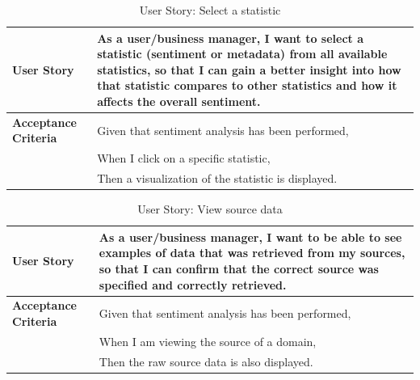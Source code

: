 \documentclass[12pt]{article}
\begin{document}
\begin{table}[htbp]
  \caption{User Story: Select a statistic}
  \begin{tabular}{|p{}|p{}|}
    \hline
    \textbf{User Story}          & As a user/business manager, I want to select a statistic (sentiment or metadata) from all available statistics, so that I can gain a better insight into how that statistic compares to other statistics and how it affects the overall sentiment. \\
    \hline
    \textbf{Acceptance Criteria} &
    Given that sentiment analysis has been performed,                                                                                                                                                                                                                                 \\
                                 & When I click on a specific statistic,                                                                                                                                                                                                              \\
                                 & Then a visualization of the statistic is displayed.                                                                                                                                                                                                \\
    \hline
  \end{tabular}
\end{table}

\begin{table}[htbp]
  \caption{User Story: View source data}
  \begin{tabular}{|p{}|p{}|}
    \hline
    \textbf{User Story}          & As a user/business manager, I want to be able to see examples of data that was retrieved from my sources, so that I can confirm that the correct source was specified and correctly retrieved. \\
    \hline
    \textbf{Acceptance Criteria} &
    Given that sentiment analysis has been performed,                                                                                                                                                                             \\
                                 & When I am viewing the source of a domain,                                                                                                                                                      \\
                                 & Then the raw source data is also displayed.                                                                                                                                                    \\
    \hline
  \end{tabular}
\end{table}
\end{document}
